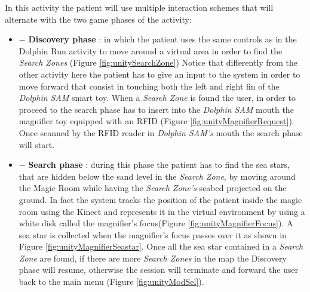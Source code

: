 In this activity the patient will use multiple interaction schemes that will alternate with the two game phases of the activity:
\begin{itemize}
	\item {$ - $} \textbf{Discovery phase} : in which the patient uses the same controls as in the Dolphin Run activity to move around a virtual area in order to find the \textit{Search Zones} (Figure \ref{fig:unitySearchZone}) Notice that differently from the other activity here the patient has to give an input to the system in order to move forward that consist in touching both the left and right fin of the \textit{Dolphin SAM} smart toy. 
	When a \textit{Search Zone} is found the user, in order to proceed to the search phase has to insert into the \textit{Dolphin SAM} mouth the magnifier toy equipped with an RFID (Figure \ref{fig:unityMagnifierRequest}).
	Once scanned by the RFID reader in \textit{Dolphin SAM's} mouth the search phase will start.
	\item {$ - $} \textbf{Search phase} : during this phase the patient has to find the sea stars, that are hidden below the sand level in the \textit{Search Zone}, by moving around the Magic Room while having the \textit{Search Zone's} seabed projected on the ground. In fact the system tracks the position of the patient inside the magic room using the Kinect and represents it in the virtual environment by using a white disk called the magnifier's focus(Figure \ref{fig:unityMagnifierFocus}).
	A sea star is collected when the magnifier's focus passes over it as shown in Figure \ref{fig:unityMagnifierSeastar}. Once all the sea star contained in a \textit{Search Zone} are found, if there are more \textit{Search Zones} in the map the Discovery phase will resume, otherwise the session will terminate and forward the user back to the main menu (Figure \ref{fig:unityModSel}).
\end{itemize}

